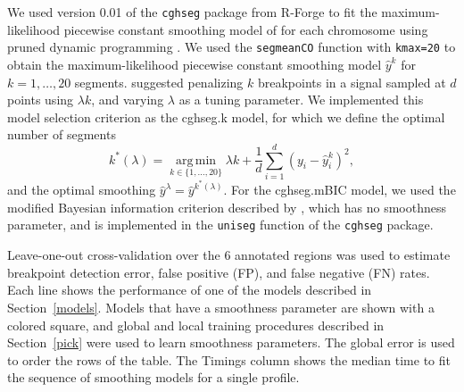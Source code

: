\documentclass{bioinfo}
\newcommand{\argmin}{\operatorname*{arg\, min}}
\newcommand{\model}[1]{#1}
\newcommand{\code}[1]{\texttt{#1}}
\newcommand{\package}[1]{\texttt{#1}}
\begin{document}
\begin{methods}
We used version 0.01 of the \package{cghseg} package from R-Forge to
fit the maximum-likelihood piecewise constant smoothing model of
\cite{statistical-approach} for each chromosome using pruned dynamic
programming \citep{pruned-dp}. We used the \code{segmeanCO} function
with \code{kmax=20} to obtain the maximum-likelihood piecewise
constant smoothing model $\hat y^k$ for $k= 1, \dots, 20$ segments.
\cite{lavielle2005} suggested penalizing $k$ breakpoints in a signal
sampled at $d$ points using $\lambda k$, and varying $\lambda$ as a
tuning parameter. We implemented this model selection criterion as the
\model{cghseg.k} model, for which we define the optimal number of
segments
\begin{equation}
  \label{eq:cghseg.k}
  k^*(\lambda) = 
\argmin_{k\in\{1,\dots,20\}}
\lambda k+  \frac 1 d \sum_{i=1}^d (y_i-\hat y_i^k)^2,
\end{equation}
and the optimal smoothing $
  \hat y^\lambda = \hat y^{k^*(\lambda)}.
$
For the \model{cghseg.mBIC} model, we used the
modified Bayesian information criterion described by \cite{mBIC},
which has no smoothness parameter, and is implemented in the
\code{uniseg} function of the \package{cghseg}
package. 



\end{methods}


\begin{table*}[hb!]
\begin{center}

\end{center}
\caption{
  \label{table-generalization-error-global-models}
  Leave-one-out cross-validation 
  over the 6 annotated regions
  was used to estimate 
  breakpoint detection error,
  false positive (FP), and false negative (FN) rates.
  Each line shows the performance of one of the models 
  described in Section~\ref{models}.
  Models that have a smoothness parameter are shown with a colored square,
  and global and local training procedures described in 
  Section~\ref{pick} were used to 
  learn smoothness parameters.
  The global error
  is used to order the rows of the table.
  The Timings column shows the median time to fit the 
  sequence of smoothing models for a single profile.
}
\end{table*}
\end{document}
